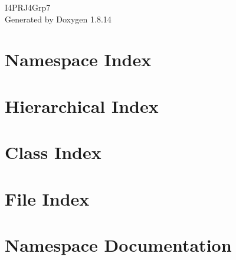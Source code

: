 \documentclass[twoside]{book}
\newcommand{\+}{\discretionary{\mbox{\scriptsize$\hookleftarrow$}}{}{}}
\newcommand{\clearemptydoublepage}{%
  \newpage{\pagestyle{empty}\cleardoublepage}%
}
\begin{document}
\hypersetup{pageanchor=false,
             bookmarksnumbered=true,
             pdfencoding=unicode
            }
\begin{titlepage}
\vspace*{7cm}
\begin{center}%
{\Large I4\+P\+R\+J4\+Grp7 }\\
\vspace*{1cm}
{\large Generated by Doxygen 1.8.14}\\
\end{center}
\end{titlepage}
\clearemptydoublepage
{}
\tableofcontents
\clearemptydoublepage
{}
\hypersetup{pageanchor=true}

\chapter{Namespace Index}

\chapter{Hierarchical Index}

\chapter{Class Index}

\chapter{File Index}

\chapter{Namespace Documentation}



















\end{document}
